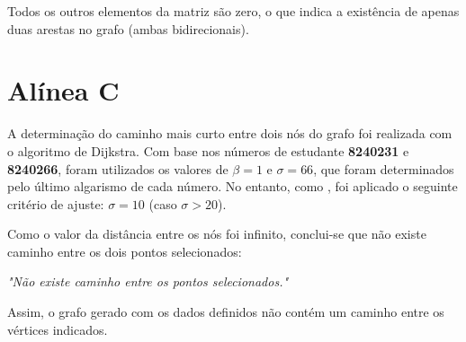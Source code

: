 Todos os outros elementos da matriz são zero, o que indica a existência de apenas duas arestas no grafo (ambas bidirecionais).

\section*{Alínea C}
A determinação do caminho mais curto entre dois nós do grafo foi realizada com o algoritmo de Dijkstra. Com base nos números de estudante \textbf{8240231} e \textbf{8240266}, foram utilizados os valores de \(\beta = 1\) e \(\sigma = 66\), que foram determinados pelo último algarismo de cada número.
No entanto, como , foi aplicado o seguinte critério de ajuste:
\newline
\(\sigma = 10\) (caso \(\sigma > 20\)).

Como o valor da distância entre os nós foi infinito, conclui-se que não existe caminho entre os dois pontos selecionados:
\begin{center}
\textit{"Não existe caminho entre os pontos selecionados."}
\end{center}

\bigskip

\noindent Assim, o grafo gerado com os dados definidos não contém um caminho entre os vértices indicados.
